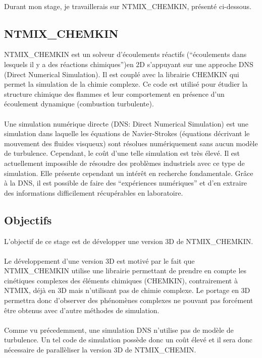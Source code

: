 \paragraph{}Durant mon stage, je travaillerais sur NTMIX\_CHEMKIN, présenté ci-dessous.


\subsection*{NTMIX\_CHEMKIN}
NTMIX\_CHEMKIN est un solveur d'écoulements réactifs (``écoulements dans lesquels il y a des réactions chimiques'')en 2D s'appuyant sur une approche DNS (Direct Numerical Simulation). Il est couplé avec la librairie CHEMKIN qui permet la simulation de la chimie complexe. Ce code est utilisé pour étudier la structure chimique des flammes et leur comportement en présence d'un écoulement dynamique (combustion turbulente).\cite{cerfacs}

\paragraph{}
Une simulation numérique directe (DNS: Direct Numerical Simulation) est une simulation dans laquelle les équations de Navier-Strokes (équations décrivant le mouvement des fluides visqueux) sont résolues numériquement sans aucun modèle de turbulence. Cependant, le coût d'une telle simulation est très élevé. Il est actuellement impossible de résoudre des problèmes industriels avec ce type de simulation. Elle présente cependant un intérêt en recherche fondamentale. Grâce à la DNS, il est possible de faire des ``expériences numériques''\cite{cfd-online-DNS} et d'en extraire des informations difficilement récupérables en laboratoire.


\subsection*{Objectifs}
L'objectif de ce stage est de développer une version 3D de NTMIX\_CHEMKIN.

\paragraph{}Le développement d'une version 3D est motivé par le fait que NTMIX\_CHEMKIN utilise une librairie permettant de prendre en compte les cinétiques complexes des éléments chimiques (CHEMKIN), contrairement à NTMIX, déjà en 3D mais n'utilisant pas de chimie complexe. Le portage en 3D permettra donc d'observer des phénomènes complexes ne pouvant pas forcément être obtenus avec d'autre méthodes de simulation.

\paragraph{}Comme vu précedemment, une simulation DNS n'utilise pas de modèle de turbulence. Un tel code de simulation possède donc un coût élevé et il sera donc nécessaire de parallèliser la version 3D de NTMIX\_CHEMIN.
